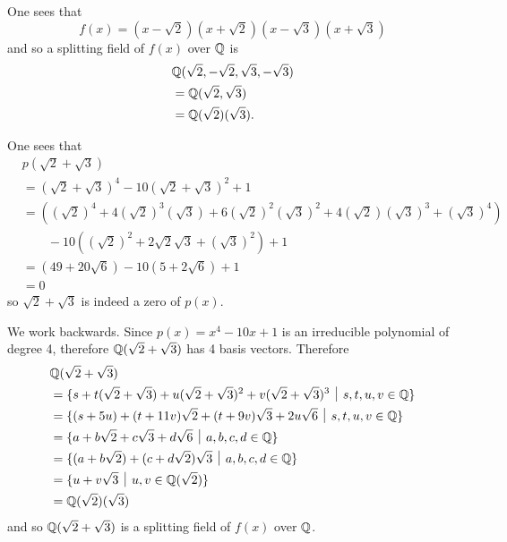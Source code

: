 \begin{questions}
    \item \begin{partquestions}{\roman*}
        \item One sees that
        \[
            f(x) = (x-\sqrt2)(x+\sqrt2)(x-\sqrt3)(x+\sqrt3)
        \]
        and so a splitting field of $f(x)$ over $\mathbb{Q}$ is
        \begin{align*}
            &\mathbb{Q}(\sqrt2, -\sqrt2, \sqrt3, -\sqrt3)\\
            &=\mathbb{Q}(\sqrt2, \sqrt3)\\
            &=\mathbb{Q}(\sqrt2)(\sqrt3).
        \end{align*}

        \item One sees that
        \begin{align*}
            &p(\sqrt2 + \sqrt3)\\
            &= (\sqrt2 + \sqrt3)^4 - 10(\sqrt2 + \sqrt3)^2 + 1\\
            &= \left((\sqrt2)^4 + 4(\sqrt2)^3(\sqrt3) + 6(\sqrt2)^2(\sqrt3)^2 + 4(\sqrt2)(\sqrt3)^3 + (\sqrt3)^4\right)\\
            &\quad\quad- 10\left((\sqrt2)^2 + 2\sqrt2\sqrt3 + (\sqrt3)^2\right) + 1\\
            &=\left(49 + 20\sqrt6\right) - 10\left(5 + 2\sqrt6\right) + 1\\
            &= 0
        \end{align*}
        so $\sqrt2 + \sqrt3$ is indeed a zero of $p(x)$.

        \item We work backwards. Since $p(x) = x^4 - 10x + 1$ is an irreducible polynomial of degree 4, therefore $\mathbb{Q}(\sqrt2 + \sqrt3)$ has 4 basis vectors. Therefore
        \begin{align*}
            &\Q(\sqrt2 + \sqrt3)\\
            &= \{s + t(\sqrt2 + \sqrt3) + u(\sqrt2 + \sqrt3)^2 + v(\sqrt2 + \sqrt3)^3 \vert s,t,u,v \in \Q\}\\
            &= \{(s + 5u) + (t + 11v)\sqrt2 + (t + 9v)\sqrt3 + 2u\sqrt6 \vert s, t, u, v \in \Q\}\\
            &= \{a + b\sqrt2 + c\sqrt3 + d\sqrt6 \vert a, b, c, d \in \Q\}\\
            &=\{(a+b\sqrt2) + (c+d\sqrt2)\sqrt3 \vert a, b, c, d \in \Q\}\\
            &=\{u + v\sqrt3 \vert u, v \in \Q(\sqrt2)\}\\
            &= \Q(\sqrt2)(\sqrt3)
        \end{align*}
        and so $\mathbb{Q}(\sqrt2 + \sqrt3)$ is a splitting field of $f(x)$ over $\mathbb{Q}$.
    \end{partquestions}


\end{questions}
